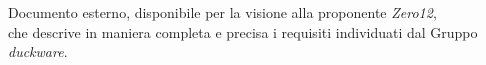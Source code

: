 Documento esterno, disponibile per la visione alla proponente \emph{Zero12},\\ che descrive in maniera completa e precisa i requisiti individuati dal Gruppo \emph{duckware}.
